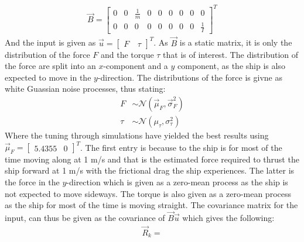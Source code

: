 \documentclass{ifacconf}
\begin{document}
\begin{align}
\vec{B} = \begin{bmatrix}
0 & 0 & \frac{1}{m} & 0 & 0 & 0 & 0 & 0 & 0\\
0 & 0 & 0 & 0 & 0 & 0 & 0 & 0 & \frac{1}{I} \end{bmatrix}^T
\end{align} 
And the input is given as $\vec{u} = \begin{bmatrix}F\ & \tau\end{bmatrix}^T$. As $\vec{B}$ is a static matrix, it is only the distribution of the force $F$ and the torque $\tau$ that is of interest. The distribution of the force are split into an $x$-component and a $y$ component, as the ship is also expected to move in the $y$-direction. The distributions of the force is givne as white Guassian noise processes, thus stating:
\begin{align}
F&\sim \mathcal{N}(\vec{\mu}_F,\vec{\sigma}^2_F)\\
\tau&\sim \mathcal{N}(\mu_\tau,\sigma^2_\tau)
\end{align}
Where the tuning through simulations have yielded the best results using $\vec{\mu}_F = \begin{bmatrix}5.4355 & 0\end{bmatrix}^T$. The first entry is because to the ship is for most of the time moving along at 1 m/s and that is the estimated force required to thrust the ship forward at 1 m/s with the frictional drag the ship experiences. The latter is the force in the $y$-direction which is given as a zero-mean process as the ship is not expected to move sideways. The torque is also given as a zero-mean process as the ship for most of the time is moving straight. The covariance matrix for the input, can thus be given as the covariance of $\vec{B}\vec{u}$ which gives the following:
\begin{align}
\vec{R}_k = 
\end{align}
\end{document}

